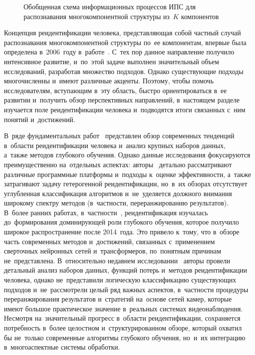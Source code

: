 \begin{figure}[htbp]
\centering

\caption{Обобщенная схема информационных процессов ИПС для распознавания
многокомпонентной структуры из~$K$ компонентов}
\label{fig:ch1/ipc-generic}
\end{figure}

Концепция реидентификации человека, представляющая собой частный случай распознавания многокомпонентной структуры по~ее компонентам, впервые была определена в~2006~году
в~работе~\cite{Gheissari2006reid}. С~тех пор данное направление получило
интенсивное развитие, и~по~этой
задаче выполнен значительный объем исследований, разработав множество подходов. Однако существующие подходы
многочисленны и~имеют различные акценты. Поэтому, чтобы помочь
исследователям, вступающим в~эту область, быстро ориентироваться в~ее
развитии и~получить обзор перспективных направлений, в~настоящем
разделе изучается поле реидентификации человека и~подводятся итоги
связанных с~ним понятий и~достижений.

В~ряде фундаментальных работ~\cite{Zheng2016reidsurvey,Chahar2017reid,Wu2019reidsurvey}
представлен обзор современных тенденций в~области реидентификации
человека и~анализ крупных наборов данных, а~также методов глубокого
обучения. Однако данные исследования фокусируются преимущественно
на~отдельных аспектах: авторы~\cite{Vezzani2013reidsurvey,Yadav2023reidsurvey,Ye2021reidsurvey}
детально рассматривают различные программные платформы и~подходы к~оценке
эффективности, а~также затрагивают задачу гетерогенной
реидентификации, но~в~их обзорах отсутствует углубленная классификация
алгоритмов и~не~уделяется должного внимания широкому спектру методов
(в~частности, переранжированию результатов). В~более ранних работах,
в~частности~\cite{BedagkarGala2014survey}, реидентификация изучалась
до~формирования доминирующей роли глубокого обучения, которое получило
широкое распространение после 2014~года. Это привело к~тому, что
в~обзоре~\cite{BedagkarGala2014survey} часть современных методов
и~достижений, связанных с~применением сверточных нейронных сетей
и~трансформеров, по~понятным причинам не~представлена. В~относительно
недавнем исследовании~\cite{Wu2019reidsurvey} авторы провели детальный
анализ наборов данных, функций потерь и~методов реидентификации человека,
однако не~представили логическую классификацию существующих подходов
и~не~рассмотрели целый ряд важных аспектов, в~частности процедуры
переранжирования результатов и~стратегий на~основе сетей
камер, которые имеют большое практическое значение в~реальных системах
видеонаблюдения. Несмотря на~значительный прогресс
в~области реидентификации, сохраняется потребность в~более целостном
и~структурированном обзоре, который охватил бы не~только современные
алгоритмы глубокого обучения, но~и~их интеграцию в~многоаспектные
системы обработки.

